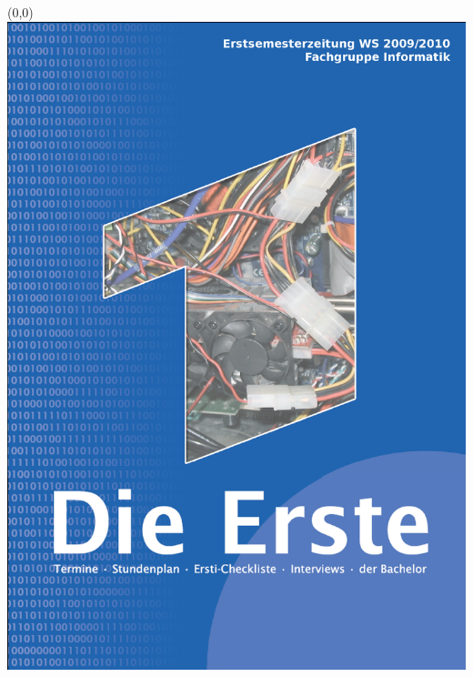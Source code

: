 \begin{titlepage}
\ifpdf
\begin{textblock}{3}(0,0)
\includegraphics[width=\paperwidth]{bilder/titelseite}
\end{textblock}
\leavevmode\newpage 
%
\else

\end{titlepage}
